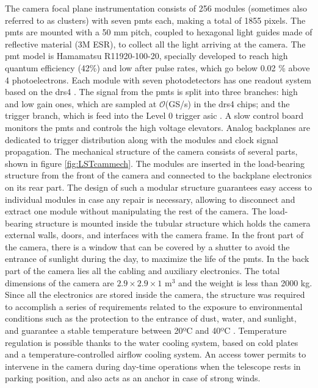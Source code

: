 \documentclass[main.tex]{subfiles}
\begin{document}
The camera focal plane instrumentation consists of 256 modules (sometimes also referred to as clusters) with seven \glspl{pmt} each, making a total of 1855 pixels. The \glspl{pmt} are mounted with a 50 mm pitch, coupled to hexagonal light guides made of reflective material (3M ESR), to collect all the light arriving at the camera. The \gls{pmt} model is Hamamatsu R11920-100-20, specially developed to reach high quantum efficiency (42\%) and low after pulse rates, which go below 0.02 \% above 4 photoelectrons. Each module with seven photodetectors has one readout system based on the \gls{drs4} \cite{DRS4}. The signal from the \glspl{pmt} is split into three branches: high and low gain ones, which are sampled at $\mathcal{O}$(GS/s) in the \gls{drs4} chips; and the trigger branch, which is feed into the Level 0 trigger \gls{asic} \cite{2017LST}. A slow control board monitors the \glspl{pmt} and controls the high voltage elevators. Analog backplanes are dedicated to trigger distribution along with the modules and clock signal propagation.
The mechanical structure of the camera consists of several parts, shown in figure \ref{fig:LSTcammech}. The modules are inserted in the load-bearing structure from the front of the camera and connected to the backplane electronics on its rear part. The design of such a modular structure guarantees easy access to individual modules in case any repair is necessary, allowing to disconnect and extract one module without manipulating the rest of the camera.
The load-bearing structure is mounted inside the tubular structure which holds the camera external walls, doors, and interfaces with the camera frame. In the front part of the camera, there is a window that can be covered by a shutter to avoid the entrance of sunlight during the day, to maximize the life of the \glspl{pmt}. In the back part of the camera lies all the cabling and auxiliary electronics. The total dimensions of the camera are $2.9\times2.9\times 1$ m$^3$ and the weight is less than 2000 kg. Since all the electronics are stored inside the camera, the structure was required to accomplish a series of requirements related to the exposure to environmental conditions such as the protection to the entrance of dust, water, and sunlight, and guarantee a stable temperature between 20ºC and 40ºC \cite{2013LSTCamMech}. Temperature regulation is possible thanks to the water cooling system, based on cold plates and a temperature-controlled airflow cooling system.
An access tower permits to intervene in the camera during day-time operations when the telescope rests in parking position, and also acts as an anchor in case of strong winds.
\end{document}
